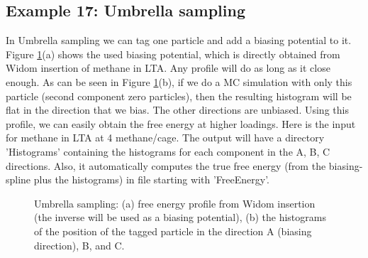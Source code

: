 \subsection*{Example 17: Umbrella sampling}

In Umbrella sampling we can tag one particle and add a biasing potential to it. Figure \ref{Fig: umbrealla sampling}(a)
shows the used biasing potential, which is directly obtained from Widom insertion of methane in LTA. Any profile will
do as long as it close enough.
As can be seen in Figure \ref{Fig: umbrealla sampling}(b), if we do a MC simulation
with only this particle (second component zero particles),
then the resulting histogram will be flat in the direction that we bias. The other directions are unbiased.
Using this profile, we can easily obtain the free energy at higher loadings. Here is the input for methane in LTA at 4 methane/cage.
The output will have a directory 'Histograms' containing the histograms for each component in the A, B, C directions. Also, it automatically
computes the true free energy (from the biasing-spline plus the histograms) in file starting with 'FreeEnergy'.

\begin{figure}[t]
  \centering
  \caption{Umbrella sampling: (a) free energy profile from Widom insertion (the inverse will be used as a biasing potential),
           (b) the histograms of the position of the tagged particle in the direction A (biasing direction), B, and C.}
  \label{Fig: umbrealla sampling}
\end{figure}

